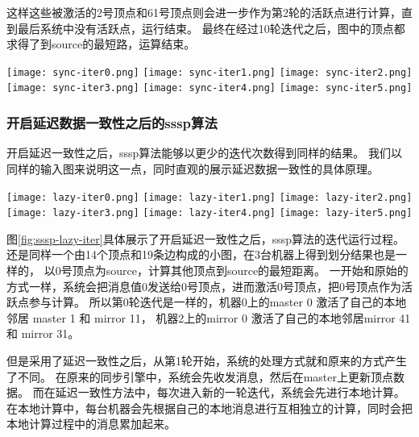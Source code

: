 这样这些被激活的2号顶点和61号顶点则会进一步作为第2轮的活跃点进行计算，直到最后系统中没有活跃点，运行结束。
最终在经过10轮迭代之后，图中的顶点都求得了到source的最短路，运算结束。


\begin{center}
  \texttt{[image: sync-iter0.png]}
  \texttt{[image: sync-iter1.png]}
  \texttt{[image: sync-iter2.png]}    
  \texttt{[image: sync-iter3.png]}    
  \texttt{[image: sync-iter4.png]}    
  \texttt{[image: sync-iter5.png]}    

  \label{fig:sssp-sync-iter}
\end{center}  

\subsubsection{开启延迟数据一致性之后的sssp算法}

开启延迟一致性之后，sssp算法能够以更少的迭代次数得到同样的结果。
我们以同样的输入图来说明这一点，同时直观的展示延迟数据一致性的具体原理。

\begin{center}
  \texttt{[image: lazy-iter0.png]}
  \texttt{[image: lazy-iter1.png]}
  \texttt{[image: lazy-iter2.png]}    
  \texttt{[image: lazy-iter3.png]}    
  \texttt{[image: lazy-iter4.png]}    
  \texttt{[image: lazy-iter5.png]}
  \label{fig:sssp-lazy-iter}
\end{center}  


图\ref{fig:sssp-lazy-iter}具体展示了开启延迟一致性之后，sssp算法的迭代运行过程。
还是同样一个由14个顶点和19条边构成的小图，在3台机器上得到划分结果也是一样的，
以0号顶点为source，计算其他顶点到source的最短距离。
一开始和原始的方式一样，系统会把消息值0发送给0号顶点，进而激活0号顶点，把0号顶点作为活跃点参与计算。  
所以第0轮迭代是一样的，机器0上的master 0 激活了自己的本地邻居 master 1 和 mirror 11，
机器2上的mirror 0 激活了自己的本地邻居mirror 41 和 mirror 31。

但是采用了延迟一致性之后，从第1轮开始，系统的处理方式就和原来的方式产生了不同。
在原来的同步引擎中，系统会先收发消息，然后在master上更新顶点数据。
而在延迟一致性方法中，每次进入新的一轮迭代，系统会先进行本地计算。
在本地计算中，每台机器会先根据自己的本地消息进行互相独立的计算，同时会把本地计算过程中的消息累加起来。

